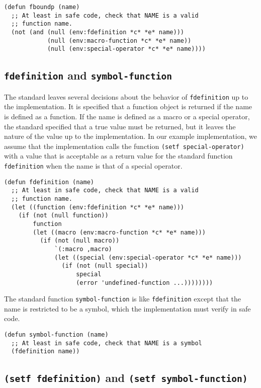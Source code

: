 \begin{verbatim}
(defun fboundp (name)
  ;; At least in safe code, check that NAME is a valid
  ;; function name.
  (not (and (null (env:fdefinition *c* *e* name)))
            (null (env:macro-function *c* *e* name))
            (null (env:special-operator *c* *e* name))))
\end{verbatim}

\subsection{\texttt{fdefinition} and \texttt{symbol-function}}

The standard leaves several decisions about the behavior of
\texttt{fdefinition} up to the implementation.  It is specified that a
function object is returned if the name is defined as a function.  If
the name is defined as a macro or a special operator, the standard
specified that a true value must be returned, but it leaves the nature
of the value up to the implementation.  In our example implementation,
we assume that the \commonlisp{} implementation calls the \sysname{}
function \texttt{(setf special-operator)} with a value that is
acceptable as a return value for the standard function
\texttt{fdefinition} when the name is that of a special operator.

\begin{verbatim}
(defun fdefinition (name)
  ;; At least in safe code, check that NAME is a valid
  ;; function name.
  (let ((function (env:fdefinition *c* *e* name)))
    (if (not (null function))
        function
        (let ((macro (env:macro-function *c* *e* name)))
          (if (not (null macro))
              `(:macro ,macro)
              (let ((special (env:special-operator *c* *e* name)))
                (if (not (null special))
                    special
                    (error 'undefined-function ...))))))))
\end{verbatim}

The standard function \texttt{symbol-function} is like
\texttt{fdefinition} except that the name is restricted to be a
symbol, which the implementation must verify in safe code.

\begin{verbatim}
(defun symbol-function (name)
  ;; At least in safe code, check that NAME is a symbol
  (fdefinition name))
\end{verbatim}

\subsection{\texttt{(setf fdefinition)} and \texttt{(setf symbol-function)}}

